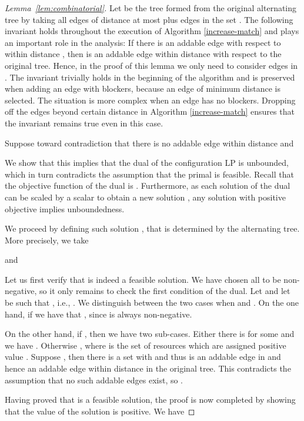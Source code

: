 \documentclass{llncs}
\begin{document}
\begin{proof}[Lemma~\ref{lem:combinatorial}]
Let  be the tree formed from the original alternating tree by taking
all edges of distance at most  plus edges in the set . The
following invariant holds throughout the execution of Algorithm
\ref{increase-match} and plays an important role in the analysis:
If there is an addable edge  with respect to  within distance
, then  is an addable edge within distance  with respect to the
original tree. Hence, in the proof of this lemma we only need to consider edges
in . The invariant trivially holds in the beginning of the algorithm
and is preserved when adding an edge with blockers, because an edge of minimum
distance is selected. The situation is more complex when an edge has no
blockers. Dropping off the edges beyond certain distance in Algorithm
\ref{increase-match} ensures that the invariant remains true even in this case.

Suppose toward contradiction that there is no addable edge within
distance  and

We show that this implies that the dual of the configuration LP is
unbounded, which in turn contradicts the assumption that the primal is feasible.
Recall that the objective function of the dual is .  Furthermore, as each solution  of the dual can
be scaled by a scalar  to obtain a new solution , any
solution with positive objective implies unboundedness.

We proceed by defining such solution , that is determined by the alternating tree.
More precisely, we take

and


Let us first verify that  is indeed a feasible solution. We have
chosen all  to be non-negative, so it only remains to check the first
condition of the dual. Let  and let  be such that , i.e., . We distinguish between the two cases when  and . On the one hand, if  we have that
, since  is always non-negative.

On the other hand, if , then we have two sub-cases.
Either there is  for some  and we have
.  Otherwise , where  is the set of resources which
are assigned positive value . Suppose , then there is a set 
with  and thus  is an addable edge in
 and hence an addable edge within distance  in the original tree.
This contradicts the assumption that no such addable edges
exist, so .

Having proved that  is a feasible solution, the proof is
now completed by showing that the value of the solution is positive.
We have


\end{proof}
\end{document}
